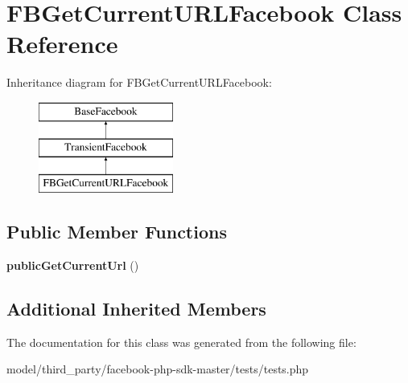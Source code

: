 \hypertarget{classFBGetCurrentURLFacebook}{\section{F\-B\-Get\-Current\-U\-R\-L\-Facebook Class Reference}
\label{classFBGetCurrentURLFacebook}
}
Inheritance diagram for F\-B\-Get\-Current\-U\-R\-L\-Facebook\-:\begin{figure}[H]
\begin{center}
\leavevmode
\includegraphics[height=3.000000cm]{classFBGetCurrentURLFacebook}
\end{center}
\end{figure}
\subsection*{Public Member Functions}
\begin{DoxyCompactItemize}
\item 
\hypertarget{classFBGetCurrentURLFacebook_a9de3408704de6fadc90f2d84f359deed}{{\bfseries public\-Get\-Current\-Url} ()}\label{classFBGetCurrentURLFacebook_a9de3408704de6fadc90f2d84f359deed}

\end{DoxyCompactItemize}
\subsection*{Additional Inherited Members}


The documentation for this class was generated from the following file\-:\begin{DoxyCompactItemize}
\item 
model/third\-\_\-party/facebook-\/php-\/sdk-\/master/tests/tests.\-php\end{DoxyCompactItemize}
